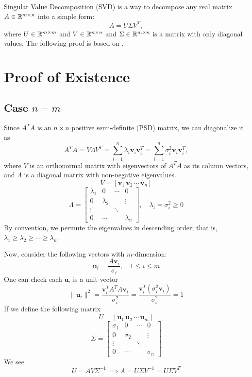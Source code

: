 





\maketitle

Singular Value Decomposition (SVD) is a way to decompose any real matrix $A \in \mathbb{R}^{m\times n}$ into a simple form:
\[
	A = U \Sigma V^T,
\]
where $U \in \mathbb{R}^{m \times m}$ and $V \in \mathbb{R}^{n \times n}$ and $\Sigma \in \mathbb{R}^{m \times n}$ is a matrix with only diagonal values. The following proof is based on \cite{svd-note}.

\section{Proof of Existence}

\subsection{Case $n = m$}

Since $A^TA$ is an $n \times n$ positive semi-definite (PSD) matrix, we can diagonalize it as
\[
	A^TA = V \Lambda V^T = \sum_{i=1}^n \lambda_i \mathbf{v}_i \mathbf{v}_i^T = \sum_{i=1}^n \sigma_i^2 \mathbf{v}_i \mathbf{v}_i^T,
\]
where $V$ is an orthonormal matrix with eigenvectors of $A^TA$ as its column vectors, and $\Lambda$ is a diagonal matrix with non-negative eigenvalues. 
\[
	V = [\mathbf{v}_1\, \mathbf{v}_2\, \cdots\, \mathbf{v}_n]
\]
\[
	\Lambda = 
	\begin{bmatrix}
		\lambda_1 &0 &\cdots &0 \\
		0 &\lambda_2 & &\vdots \\
		\vdots & &\ddots \\
		0 &\cdots & &\lambda_n
	\end{bmatrix}
	,\quad \lambda_i = \sigma_i^2 \geq 0
\]
By convention, we permute the eigenvalues in descending order; that is, $\lambda_1 \geq \lambda_2 \geq \cdots \geq \lambda_n$.

Now, consider the following vectors with $m$-dimension:
\[
	\mathbf{u}_i = \frac{A \mathbf{v}_i}{\sigma_i}, \quad 1\leq i \leq m
\]
One can check each $\mathbf{u}_i$ is a unit vector
\[
	\|\mathbf{u}_i\|^2 = \frac{\mathbf{v}_i^TA^TA\mathbf{v}_i}{\sigma_i^2} = \frac{\mathbf{v}_i^T (\sigma_i^2 \mathbf{v}_i)}{\sigma_i^2} = 1
\]
If we define the following matrix
\[
	U = [\mathbf{u}_1\, \mathbf{u}_2\, \cdots\, \mathbf{u}_m]
\]
\[
	\Sigma = 
	\begin{bmatrix}
		\sigma_1 &0 &\cdots &0 \\
		0 &\sigma_2 & &\vdots \\
		\vdots & &\ddots \\
		0 &\cdots & &\sigma_n
	\end{bmatrix}
\]
We see
\[
	U = AV\Sigma^{-1} \implies A = U\Sigma V^{-1} = U\Sigma V^T
\]

